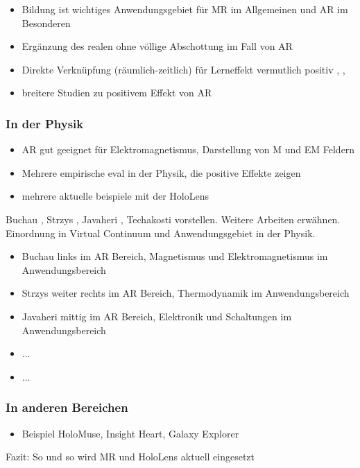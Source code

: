 \begin{itemize}
	\item Bildung ist wichtiges Anwendungsgebiet für MR im Allgemeinen und AR im Besonderen
	\item Ergänzung des realen ohne völlige Abschottung im Fall von AR
	\item Direkte Verknüpfung (räumlich-zeitlich) für Lerneffekt vermutlich positiv \cite{Akcayir17}, \cite{Chen2017}, \cite{Knierim18}
	\item breitere Studien zu positivem Effekt von AR
\end{itemize}

\subsubsection{In der Physik}
\begin{itemize}
	\item AR gut geeignet für Elektromagnetismus, Darstellung von M und EM Feldern
	\item Mehrere empirische eval in der Physik, die positive Effekte zeigen
	\item mehrere aktuelle beispiele mit der HoloLens
\end{itemize}
Buchau \cite{Buchau09}, Strzys \cite{Strzys18}, Javaheri \cite{Javaheri18}, Techakosti \cite{Techakosit15} vorstellen. Weitere Arbeiten erwähnen.\\
Einordnung in Virtual Continuum und Anwendungsgebiet in der Physik.
\begin{itemize}
	\item Buchau links im AR Bereich, Magnetismus und Elektromagnetismus im Anwendungsbereich
	\item Strzys weiter rechts im AR Bereich, Thermodynamik im Anwendungsbereich
	\item Javaheri mittig im AR Bereich, Elektronik und Schaltungen im Anwendungsbereich
	\item ...
	\item ...
\end{itemize}

\subsubsection{In anderen Bereichen}
\begin{itemize}
	\item Beispiel HoloMuse, Insight Heart, Galaxy Explorer 
\end{itemize}

Fazit: So und so wird MR und HoloLens aktuell eingesetzt

